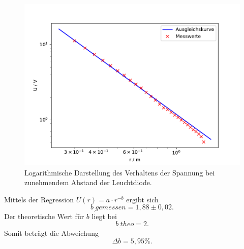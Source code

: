 \begin{figure}
\centering
\includegraphics[width=\linewidth-75pt,height=\textheight-75pt,keepaspectratio]{content/images/plot3.pdf}
\caption{Logarithmische Darstellung des Verhaltens der Spannung bei zunehmendem Abstand der Leuchtdiode.}\label{fig:U5}
\end{figure}

\noindent Mittels der Regression $U(r)=a\cdot r^{-b}$ ergibt sich
\[
b_.{gemessen}=1,88\pm 0,02 \text{.}
\]
Der theoretische Wert für $b$ liegt bei 
\[
b_.{theo}=2 \text{.}
\]
Somit beträgt die Abweichung
\[
\Delta b = 5,95 \% \text{.}
\]